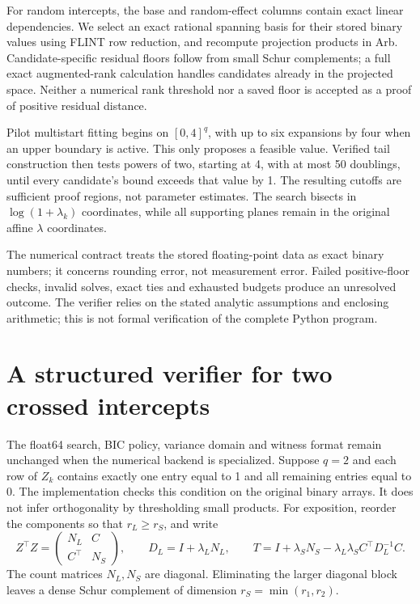 \documentclass[preprint,11pt,numbers]{elsarticle}
\theoremstyle{remark}\newtheorem{remark}[theorem]{Remark}
\begin{document}
For random intercepts, the base and random-effect columns contain exact linear
dependencies. We select an exact rational spanning basis for their stored binary
values using FLINT row reduction, and recompute projection products in Arb.
Candidate-specific residual floors follow from small Schur complements; a full
exact augmented-rank calculation handles candidates already in the projected
space. Neither a numerical rank threshold nor a saved floor is accepted as a
proof of positive residual distance.

Pilot multistart fitting begins on $[0,4]^q$, with up to six expansions by four
when an upper boundary is active. This only proposes a feasible value. Verified
tail construction then tests powers of two, starting at 4, with at most 50
doublings, until every candidate's bound exceeds that value by 1. The resulting
cutoffs are sufficient proof regions, not parameter estimates. The search
bisects in $\log(1+\lambda_k)$ coordinates, while all supporting planes remain
in the original affine $\lambda$ coordinates.

The numerical contract treats the stored floating-point data as exact binary
numbers; it concerns rounding error, not measurement error. Failed positive-floor
checks, invalid solves, exact ties and exhausted budgets produce an unresolved
outcome. The verifier relies on the stated analytic assumptions and enclosing
arithmetic; this is not formal verification of the complete Python program.
\section{A structured verifier for two crossed intercepts}\label{sec:structured}
The float64 search, BIC policy, variance domain and witness format remain unchanged when the numerical backend is specialized. Suppose $q=2$
and each row of $Z_k$ contains exactly one entry equal to 1 and all remaining
entries equal to 0. The implementation checks this condition on the original
binary arrays. It does not infer orthogonality by thresholding small products.
For exposition, reorder the components so that $r_L\geq r_S$, and write
\[
Z^\top Z=\begin{pmatrix}N_L&C\\C^\top&N_S\end{pmatrix},\qquad
D_L=I+\lambda_LN_L,\qquad
T=I+\lambda_SN_S-\lambda_L\lambda_SC^\top D_L^{-1}C.
\]
The count matrices $N_L,N_S$ are diagonal. Eliminating the larger diagonal block
leaves a dense Schur complement of dimension $r_S=\min(r_1,r_2)$.
\end{document}
